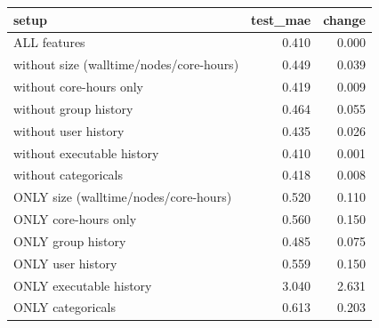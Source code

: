 \begin{tabular}{lrr}
\toprule
setup & test_mae & change \\
\midrule
ALL features & 0.410 & 0.000 \\
without size (walltime/nodes/core-hours) & 0.449 & 0.039 \\
without core-hours only & 0.419 & 0.009 \\
without group history & 0.464 & 0.055 \\
without user history & 0.435 & 0.026 \\
without executable history & 0.410 & 0.001 \\
without categoricals & 0.418 & 0.008 \\
ONLY size (walltime/nodes/core-hours) & 0.520 & 0.110 \\
ONLY core-hours only & 0.560 & 0.150 \\
ONLY group history & 0.485 & 0.075 \\
ONLY user history & 0.559 & 0.150 \\
ONLY executable history & 3.040 & 2.631 \\
ONLY categoricals & 0.613 & 0.203 \\
\bottomrule
\end{tabular}
